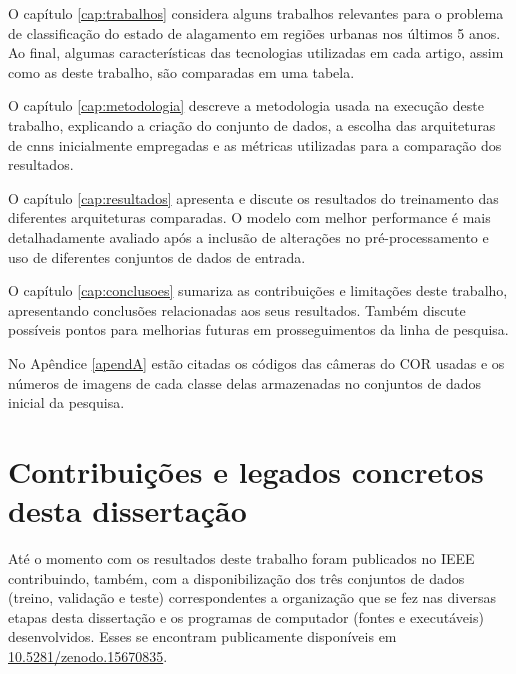 O capítulo \ref{cap:trabalhos} considera alguns trabalhos relevantes para o problema de classificação do estado de alagamento em regiões urbanas nos últimos 5 anos.
Ao final, algumas características das tecnologias utilizadas em cada artigo, assim como as deste trabalho, são comparadas em uma tabela.

O capítulo \ref{cap:metodologia} descreve a metodologia usada na execução deste trabalho,
explicando a criação do conjunto de dados, a escolha das arquiteturas de \acrshort{cnn}s inicialmente empregadas e as métricas utilizadas para a comparação dos resultados.

O capítulo \ref{cap:resultados} apresenta e discute os resultados do treinamento das diferentes arquiteturas comparadas.
O modelo com melhor performance é mais detalhadamente avaliado após a inclusão de alterações no pré-processamento e uso de diferentes conjuntos de dados de entrada.

O capítulo \ref{cap:conclusoes} sumariza as contribuições e limitações deste trabalho, apresentando conclusões relacionadas aos seus resultados.
Também discute possíveis pontos para melhorias futuras em prosseguimentos da linha de pesquisa.

No Apêndice \ref{apendA} estão citadas os códigos das câmeras do COR usadas e os números de imagens de cada classe delas armazenadas no conjuntos de dados inicial da pesquisa.

\section{Contribuições e legados concretos desta dissertação}\label{Contribuições}

Até o momento com os resultados deste trabalho foram publicados no IEEE \cite{goncalves2024} contribuindo, também, com a disponibilização dos três conjuntos de dados (treino, validação e teste)
correspondentes a organização que se fez nas diversas etapas desta dissertação e os programas de computador (fontes e executáveis) desenvolvidos. 
Esses se encontram publicamente disponíveis em \href{https://doi.org/10.5281/zenodo.15670835}{10.5281/zenodo.15670835}.
